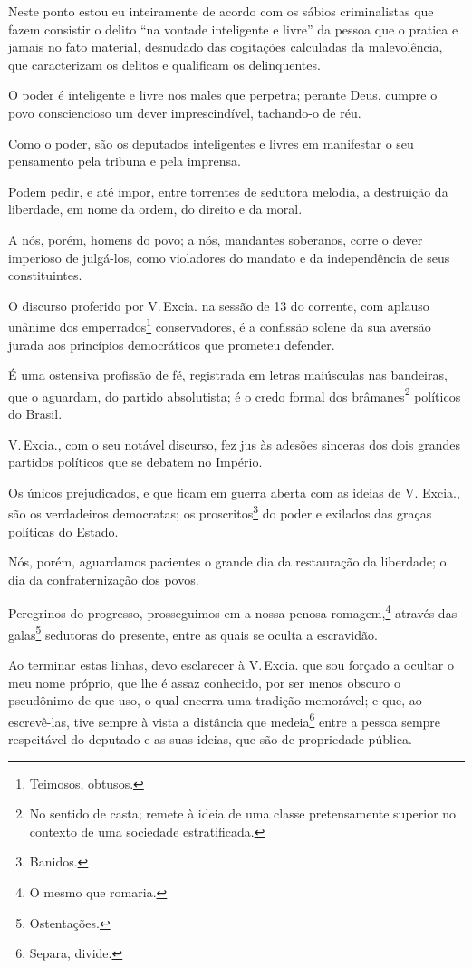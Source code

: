 Neste ponto estou eu inteiramente de acordo com os sábios criminalistas
que fazem consistir o delito ``na vontade inteligente e livre'' da pessoa
que o pratica e jamais no fato material, desnudado das cogitações
calculadas da malevolência, que caracterizam os delitos e qualificam os
delinquentes.

O poder é inteligente e livre nos males que perpetra; perante Deus,
cumpre o povo consciencioso um dever imprescindível, tachando-o de réu.

Como o poder, são os deputados inteligentes e livres em manifestar o seu
pensamento pela tribuna e pela imprensa.

Podem pedir, e até impor, entre torrentes de sedutora melodia, a
destruição da liberdade, em nome da ordem, do direito e da moral.

A nós, porém, homens do povo; a nós, mandantes soberanos, corre o dever
imperioso de julgá-los, como violadores do mandato e da independência de
seus constituintes.

O discurso proferido por V.\,Excia. na sessão de 13 do corrente, com
aplauso unânime dos emperrados\footnote{Teimosos, obtusos.}
conservadores, é a confissão solene da sua aversão jurada aos princípios
democráticos que prometeu defender.

É uma ostensiva profissão de fé, registrada em letras maiúsculas nas
bandeiras, que o aguardam, do partido absolutista; é o credo formal dos
brâmanes\footnote{No sentido de casta; remete à ideia de uma classe
  pretensamente superior no contexto de uma sociedade estratificada.}
políticos do Brasil.

V.\,Excia., com o seu notável discurso, fez jus às adesões sinceras dos
dois grandes partidos políticos que se debatem no Império.

Os únicos prejudicados, e que ficam em guerra aberta com as ideias de V.
Excia., são os verdadeiros democratas; os proscritos\footnote{Banidos.}
do poder e exilados das graças políticas do Estado.

Nós, porém, aguardamos pacientes o grande dia da restauração da
liberdade; o dia da confraternização dos povos.

Peregrinos do progresso, prosseguimos em a nossa penosa
romagem,\footnote{O mesmo que romaria.} através das galas\footnote{
  Ostentações.} sedutoras do presente, entre as quais se oculta a
escravidão.

Ao terminar estas linhas, devo esclarecer à V.\,Excia. que sou forçado a
ocultar o meu nome próprio, que lhe é assaz conhecido, por ser menos
obscuro o pseudônimo de que uso, o qual encerra uma tradição memorável;
e que, ao escrevê-las, tive sempre à vista a distância que
medeia\footnote{Separa, divide.} entre a pessoa sempre respeitável do
deputado e as suas ideias, que são de propriedade pública.

